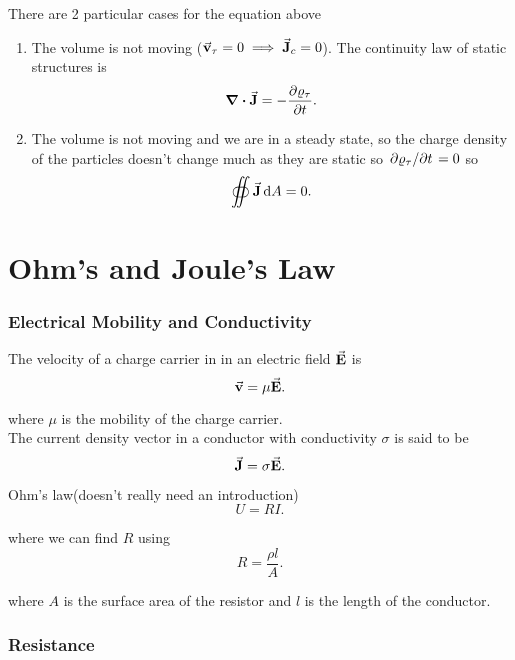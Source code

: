 \documentclass[a4paper,12pt]{article}
\begin{document}
There are 2 particular cases for the equation above
\begin{enumerate}
	\item The volume is not moving ($\va{v}_\tau=0 \implies \va{J}_c=0$). The continuity law of static structures is
	      \begin{equation}
		      \div{\va{J}}=-\pdv{\varrho_\tau}{t}
		      .\end{equation}
	\item The volume is not moving and we are in a steady state, so the charge density of the particles doesn't change much as they are static so $\pdv*{\varrho_\tau}{t}=0 $ so
	      \begin{equation}
		      \oiint \va{J}\dd {A}=0
		      .\end{equation}
\end{enumerate}

\part{Ohm's and Joule's Law}
\section{Electrical Mobility and Conductivity}
The velocity of a charge carrier in in an electric field $\va{E}$ is
\begin{equation}
	\va{v}=\mu\va{E}
	.\end{equation}

where $\mu$ is the mobility of the charge carrier.\\

The current density vector in a conductor with conductivity $\sigma$ is said to be
\begin{equation}
	\va{J}=\sigma\va{E}
	.\end{equation}

Ohm's law(doesn't really need an introduction)
\begin{equation}
	U=RI
	.\end{equation}

where we can find $R$ using
\begin{equation}
	R=\frac{\rho l}{A}
	.\end{equation}

where $A$ is the surface area of the resistor and $l$ is the length of the conductor.


\section{Resistance}
\end{document}
